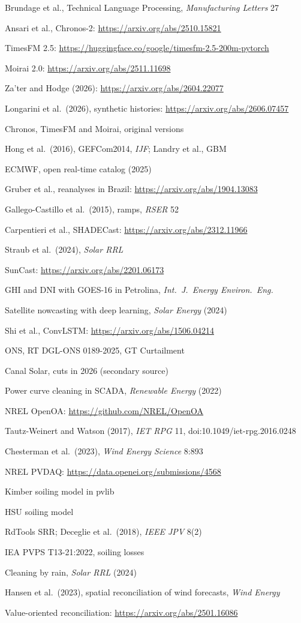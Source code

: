 {\begin{enumerate}[label={[\arabic*]},leftmargin=2.2em,itemsep=1pt]
\item Brundage et al., Technical Language Processing, \emph{Manufacturing Letters} 27
\item Ansari et al., Chronos-2: \url{https://arxiv.org/abs/2510.15821}
\item TimesFM 2.5: \url{https://huggingface.co/google/timesfm-2.5-200m-pytorch}
\item Moirai 2.0: \url{https://arxiv.org/abs/2511.11698}
\item Za'ter and Hodge (2026): \url{https://arxiv.org/abs/2604.22077}
\item Longarini et al.\ (2026), synthetic histories: \url{https://arxiv.org/abs/2606.07457}
\item Chronos, TimesFM and Moirai, original versions
\item Hong et al.\ (2016), GEFCom2014, \emph{IJF}; Landry et al., GBM
\item ECMWF, open real-time catalog (2025)
\item Gruber et al., reanalyses in Brazil: \url{https://arxiv.org/abs/1904.13083}
\item Gallego-Castillo et al.\ (2015), ramps, \emph{RSER} 52
\item Carpentieri et al., SHADECast: \url{https://arxiv.org/abs/2312.11966}
\item Straub et al.\ (2024), \emph{Solar RRL}
\item SunCast: \url{https://arxiv.org/abs/2201.06173}
\item GHI and DNI with GOES-16 in Petrolina, \emph{Int.\ J.\ Energy Environ.\ Eng.}
\item Satellite nowcasting with deep learning, \emph{Solar Energy} (2024)
\item Shi et al., ConvLSTM: \url{https://arxiv.org/abs/1506.04214}
\item ONS, RT DGL-ONS 0189-2025, GT Curtailment
\item Canal Solar, cuts in 2026 (secondary source)
\item Power curve cleaning in SCADA, \emph{Renewable Energy} (2022)
\item NREL OpenOA: \url{https://github.com/NREL/OpenOA}
\item Tautz-Weinert and Watson (2017), \emph{IET RPG} 11, doi:10.1049/iet-rpg.2016.0248
\item Chesterman et al.\ (2023), \emph{Wind Energy Science} 8:893
\item NREL PVDAQ: \url{https://data.openei.org/submissions/4568}
\item Kimber soiling model in pvlib
\item HSU soiling model
\item RdTools SRR; Deceglie et al.\ (2018), \emph{IEEE JPV} 8(2)
\item IEA PVPS T13-21:2022, soiling losses
\item Cleaning by rain, \emph{Solar RRL} (2024)
\item Hansen et al.\ (2023), spatial reconciliation of wind forecasts, \emph{Wind Energy}
\item Value-oriented reconciliation: \url{https://arxiv.org/abs/2501.16086}
\end{enumerate}}
